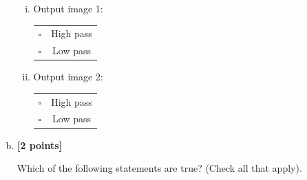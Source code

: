 \begin{enumerate}[(a)]
\begin{enumerate}[(i)]
\item
Output image 1:\\
\begin{tabular}[h]{lc}
$\square$ & High pass \\
$\square$ & Low pass \\
\end{tabular}

\item
Output image 2:\\
\begin{tabular}[h]{lc}
$\square$ & High pass \\
$\square$ & Low pass \\
\end{tabular}
\end{enumerate}

\item \textbf{[2 points]}
\begin{tcolorbox}[colback=orange!5!white,colframe=orange!75!black]
Which of the following statements are true? (Check all that apply).
\end{tcolorbox}


\end{enumerate}
